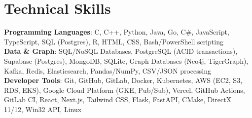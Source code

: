 \documentclass[letterpaper,11pt]{article}
\begin{document}
%
\section{Technical Skills}
 \begin{itemize}[leftmargin=0.15in, label={}]
   \small{\item{
  \textbf{Programming Languages}{: C, C++, Python, Java, Go, C\#, JavaScript, TypeScript, SQL (Postgres), R, HTML, CSS, Bash/PowerShell scripting} \\
  \textbf{Data \& Graph}{: SQL/NoSQL Databases, PostgreSQL (ACID transactions), Supabase (Postgres), MongoDB, SQLite, Graph Databases (Neo4j, TigerGraph), Kafka, Redis, Elasticsearch, Pandas/NumPy, CSV/JSON processing} \\
  \textbf{Developer Tools}{: Git, GitHub, GitLab, Docker, Kubernetes, AWS (EC2, S3, RDS, EKS), Google Cloud Platform (GKE, Pub/Sub), Vercel, GitHub Actions, GitLab CI, React, Next.js, Tailwind CSS, Flask, FastAPI, CMake, DirectX 11/12, Win32 API, Linux}
   }}
 \end{itemize}


\end{document}
